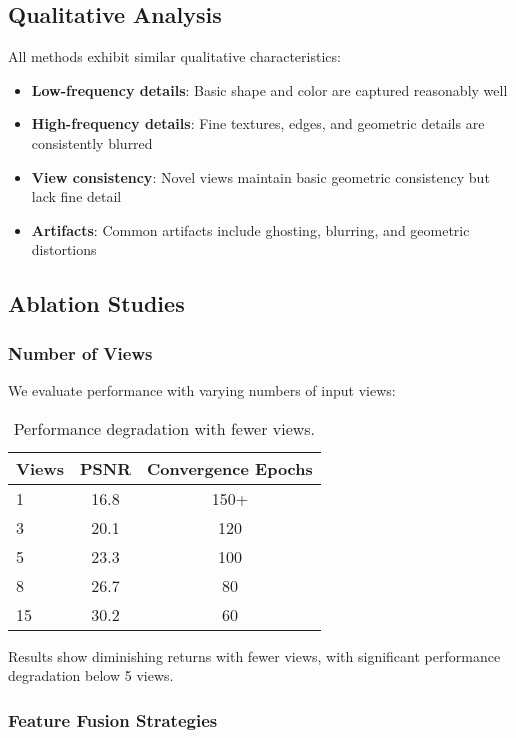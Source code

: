 \documentclass[11pt]{article}
\begin{document}
\subsection{Qualitative Analysis}

All methods exhibit similar qualitative characteristics:
\begin{itemize}
    \item \textbf{Low-frequency details}: Basic shape and color are captured reasonably well
    \item \textbf{High-frequency details}: Fine textures, edges, and geometric details are consistently blurred
    \item \textbf{View consistency}: Novel views maintain basic geometric consistency but lack fine detail
    \item \textbf{Artifacts}: Common artifacts include ghosting, blurring, and geometric distortions
\end{itemize}

\subsection{Ablation Studies}

\subsubsection{Number of Views}

We evaluate performance with varying numbers of input views:

\begin{table}[h]
\centering
\begin{tabular}{lcc}
\toprule
Views & PSNR & Convergence Epochs \\
\midrule
1 & 16.8 & 150+ \\
3 & 20.1 & 120 \\
5 & 23.3 & 100 \\
8 & 26.7 & 80 \\
15 & 30.2 & 60 \\
\bottomrule
\end{tabular}
\caption{Performance degradation with fewer views.}
\label{tab:views_ablation}
\end{table}

Results show diminishing returns with fewer views, with significant performance degradation below 5 views.

\subsubsection{Feature Fusion Strategies}
\end{document}
